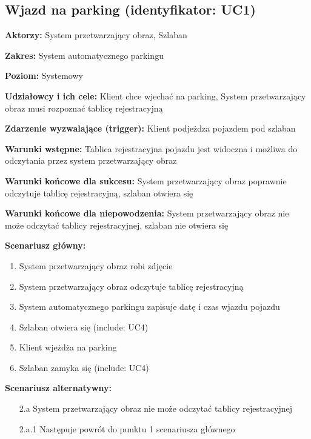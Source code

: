\subsection{Wjazd na parking (identyfikator: UC1)}
\textbf{Aktorzy: }System przetwarzający obraz, Szlaban

\hspace{0cm}\textbf{Zakres: } System automatycznego parkingu

\hspace{0cm}\textbf{Poziom: } Systemowy

\hspace{0cm}\textbf{Udziałowcy i ich cele: } Klient chce wjechać na parking, System przetwarzający obraz musi rozpoznać tablicę rejestracyjną

\hspace{0cm}\textbf{Zdarzenie wyzwalające (trigger): } Klient podjeżdza pojazdem pod szlaban

\hspace{0cm}\textbf{Warunki wstępne: } Tablica rejestracyjna pojazdu jest widoczna i możliwa do odczytania przez system przetwarzający obraz

\hspace{0cm}\textbf{Warunki końcowe dla sukcesu: }
System przetwarzający obraz poprawnie odczytuje tablicę rejestracyjną, szlaban otwiera się

\hspace{0cm}\textbf{Warunki końcowe dla niepowodzenia: } System przetwarzający obraz nie może odczytać tablicy rejestracyjnej, szlaban nie otwiera się \newline

\hspace{0cm}\textbf{Scenariusz główny: }
\begin{enumerate}
\item System przetwarzający obraz robi zdjęcie
\item System przetwarzający obraz odczytuje tablicę rejestracyjną
\item System automatycznego parkingu zapisuje datę i czas wjazdu pojazdu
\item Szlaban otwiera się (include: UC4)
\item Klient wjeżdża na parking
\item Szlaban zamyka się (include: UC4)
\end{enumerate}
\hspace{0cm}\textbf{Scenariusz alternatywny: }
\begin{enumerate}
\item[2.a] System przetwarzający obraz nie może odczytać tablicy rejestracyjnej
\item[2.a.1] Następuje powrót do punktu 1 scenariusza głównego
\end{enumerate}


